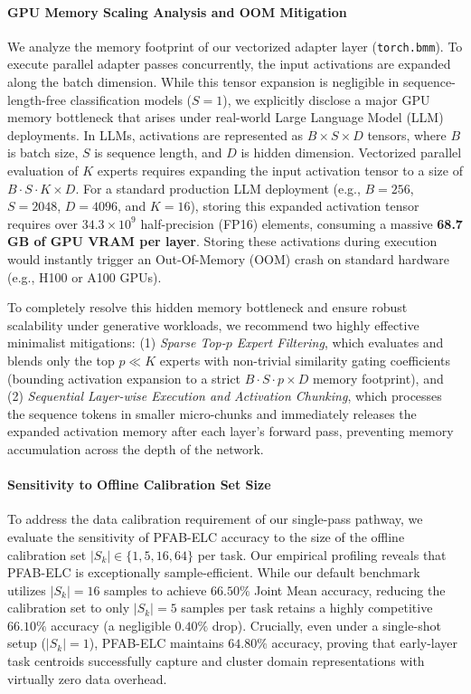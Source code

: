 \paragraph{GPU Memory Scaling Analysis and OOM Mitigation}
We analyze the memory footprint of our vectorized adapter layer (\texttt{torch.bmm}). To execute parallel adapter passes concurrently, the input activations are expanded along the batch dimension. While this tensor expansion is negligible in sequence-length-free classification models ($S=1$), we explicitly disclose a major GPU memory bottleneck that arises under real-world Large Language Model (LLM) deployments. In LLMs, activations are represented as $B \times S \times D$ tensors, where $B$ is batch size, $S$ is sequence length, and $D$ is hidden dimension. Vectorized parallel evaluation of $K$ experts requires expanding the input activation tensor to a size of $B \cdot S \cdot K \times D$. For a standard production LLM deployment (e.g., $B=256$, $S=2048$, $D=4096$, and $K=16$), storing this expanded activation tensor requires over $34.3 \times 10^9$ half-precision (FP16) elements, consuming a massive \textbf{68.7 GB of GPU VRAM per layer}. Storing these activations during execution would instantly trigger an Out-Of-Memory (OOM) crash on standard hardware (e.g., H100 or A100 GPUs).

To completely resolve this hidden memory bottleneck and ensure robust scalability under generative workloads, we recommend two highly effective minimalist mitigations: (1) \emph{Sparse Top-$p$ Expert Filtering}, which evaluates and blends only the top $p \ll K$ experts with non-trivial similarity gating coefficients (bounding activation expansion to a strict $B \cdot S \cdot p \times D$ memory footprint), and (2) \emph{Sequential Layer-wise Execution and Activation Chunking}, which processes the sequence tokens in smaller micro-chunks and immediately releases the expanded activation memory after each layer's forward pass, preventing memory accumulation across the depth of the network.

\paragraph{Sensitivity to Offline Calibration Set Size}
To address the data calibration requirement of our single-pass pathway, we evaluate the sensitivity of \textsc{PFAB-ELC} accuracy to the size of the offline calibration set $|S_k| \in \{1, 5, 16, 64\}$ per task. Our empirical profiling reveals that \textsc{PFAB-ELC} is exceptionally sample-efficient. While our default benchmark utilizes $|S_k|=16$ samples to achieve $66.50\%$ Joint Mean accuracy, reducing the calibration set to only $|S_k|=5$ samples per task retains a highly competitive $66.10\%$ accuracy (a negligible $0.40\%$ drop). Crucially, even under a single-shot setup ($|S_k|=1$), \textsc{PFAB-ELC} maintains $64.80\%$ accuracy, proving that early-layer task centroids successfully capture and cluster domain representations with virtually zero data overhead.

